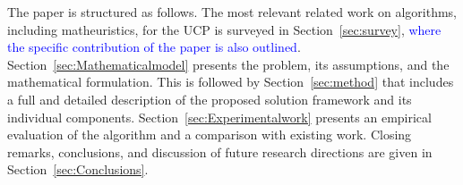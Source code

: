 The paper is structured as follows. The most relevant related work
on algorithms, including matheuristics, for the UCP is surveyed in Section~\ref{sec:survey}, \textcolor{blue}{where the specific contribution of the paper is also outlined}.  Section~\ref{sec:Mathematicalmodel}
presents the problem, its assumptions, and the mathematical formulation.
This is followed by Section~\ref{sec:method}
that includes a full and detailed description of the proposed
solution framework and its individual components.
Section~\ref{sec:Experimentalwork}
presents an empirical evaluation of
the algorithm and a comparison with existing work.
Closing remarks, conclusions, and discussion of
future research directions are given in Section~\ref{sec:Conclusions}.



